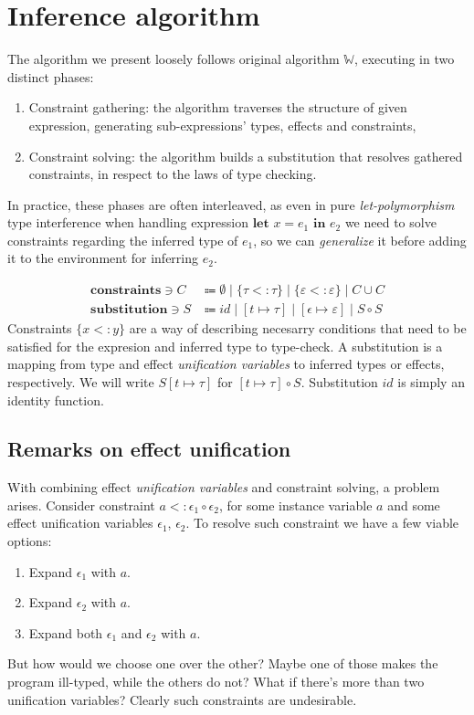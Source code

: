 \documentclass[declaration,shortabstract]{iithesis}
\theoremstyle{definition} \newtheorem{definition}{Definition}[section]
\begin{document}
\chapter{Inference algorithm}
The algorithm we present loosely follows original algorithm $\mathbb{W}$, executing in two distinct phases:
\begin{enumerate}
    \item Constraint gathering: the algorithm traverses the structure of given expression,
    generating sub-expressions' types, effects and constraints,
    \item Constraint solving: the algorithm builds a substitution that resolves gathered constraints,
    in respect to the laws of type checking.
\end{enumerate}
In practice, these phases are often interleaved, as even in pure \textit{let-polymorphism} type interference when handling expression $\textbf{let } x = e_1 \textbf{ in } e_2$  we need to solve constraints regarding the inferred type of $e_1$, so we can \textit{generalize} it before adding it to the environment for inferring $e_2$.

\begin{align*}
 \textbf{constraints} \ni C &\Coloneqq
    \emptyset  \mid  \{\tau <: \tau\} \mid \{\varepsilon <: \varepsilon\} \mid C \cup C 
    \\
 \textbf{substitution} \ni S &\Coloneqq
    {id}  \mid  [t \mapsto  \tau] \mid [\epsilon \mapsto  \varepsilon] \mid S \circ S 
\end{align*}
Constraints $\{x <: y\}$ are a way of describing necesarry conditions that need to be satisfied
for the expresion and inferred type to type-check.
A substitution is a mapping from type and effect \textit{unification variables} to
inferred types or effects, respectively.
We will write $S[t \mapsto \tau]$ for $[t\mapsto \tau] \circ S$.
Substitution $id$ is simply an identity function.

\section{Remarks on effect unification}
With combining effect \textit{unification variables} and constraint solving, a problem arises.
Consider constraint $a <: \epsilon_1 \circ \epsilon_2$,
for some instance variable $a$ and some effect unification variables $\epsilon_1$, $\epsilon_2$.
To resolve such constraint we have a few viable options:
\begin{enumerate}
    \item Expand $\epsilon_1$ with $a$.
    \item Expand $\epsilon_2$ with $a$.
    \item Expand both $\epsilon_1$ and $\epsilon_2$ with $a$.
\end{enumerate}
But how would we choose one over the other? Maybe one of those makes the program ill-typed, while the others do not? What if there's more than two unification variables? Clearly such constraints are undesirable.
\end{document}
